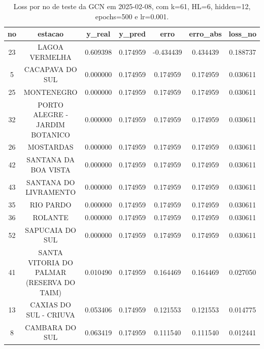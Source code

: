 \begin{table}[h]
\centering
\caption{Loss por no de teste da GCN em 2025-02-08, com k=61, HL=6, hidden=12, epochs=500 e lr=0.001.}
\label{tab:gcn_loss_k61_hl6_h12_e500_d20250208}
\begin{tabular}{ccccccc}
\toprule
no & estacao & y\_real & y\_pred & erro & erro\_abs & loss\_no \\
\midrule
23 & LAGOA VERMELHA & 0.609398 & 0.174959 & -0.434439 & 0.434439 & 0.188737 \\
5 & CACAPAVA DO SUL & 0.000000 & 0.174959 & 0.174959 & 0.174959 & 0.030611 \\
25 & MONTENEGRO & 0.000000 & 0.174959 & 0.174959 & 0.174959 & 0.030611 \\
32 & PORTO ALEGRE - JARDIM BOTANICO & 0.000000 & 0.174959 & 0.174959 & 0.174959 & 0.030611 \\
26 & MOSTARDAS & 0.000000 & 0.174959 & 0.174959 & 0.174959 & 0.030611 \\
42 & SANTANA DA BOA VISTA & 0.000000 & 0.174959 & 0.174959 & 0.174959 & 0.030611 \\
43 & SANTANA DO LIVRAMENTO & 0.000000 & 0.174959 & 0.174959 & 0.174959 & 0.030611 \\
35 & RIO PARDO & 0.000000 & 0.174959 & 0.174959 & 0.174959 & 0.030611 \\
36 & ROLANTE & 0.000000 & 0.174959 & 0.174959 & 0.174959 & 0.030611 \\
52 & SAPUCAIA DO SUL & 0.000000 & 0.174959 & 0.174959 & 0.174959 & 0.030611 \\
41 & SANTA VITORIA DO PALMAR (RESERVA DO TAIM) & 0.010490 & 0.174959 & 0.164469 & 0.164469 & 0.027050 \\
13 & CAXIAS DO SUL - CRIUVA & 0.053406 & 0.174959 & 0.121553 & 0.121553 & 0.014775 \\
8 & CAMBARA DO SUL & 0.063419 & 0.174959 & 0.111540 & 0.111540 & 0.012441 \\
\bottomrule
\end{tabular}
\end{table}
